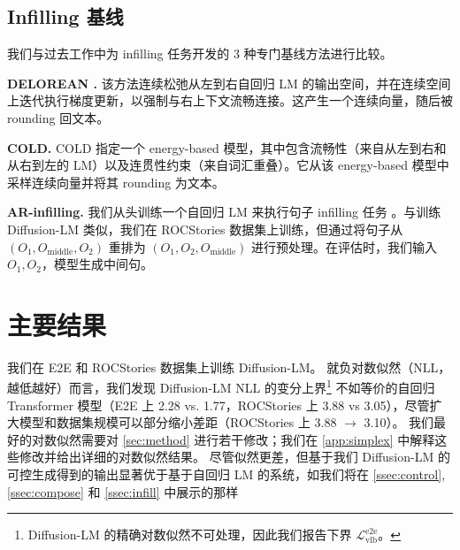 \documentclass{article}
\begin{document}
\subsection{Infilling 基线}

我们与过去工作中为 infilling 任务开发的 3 种专门基线方法进行比较。

\textbf{DELOREAN \cite{qin-etal-2020-back}.} 该方法连续松弛从左到右自回归 LM 的输出空间，并在连续空间上迭代执行梯度更新，以强制与右上下文流畅连接。这产生一个连续向量，随后被 rounding 回文本。

\textbf{COLD\cite{Qin-COLD}.} COLD 指定一个 energy-based 模型，其中包含流畅性（来自从左到右和从右到左的 LM）以及连贯性约束（来自词汇重叠）。它从该 energy-based 模型中采样连续向量并将其 rounding 为文本。


\textbf{AR-infilling.} 我们从头训练一个自回归 LM 来执行句子 infilling 任务 \cite{donahue-etal-2020-enabling}。与训练 Diffusion-LM 类似，我们在 ROCStories 数据集上训练，但通过将句子从 $(O_1, O_\text{middle} , O_2)$ 重排为 $(O_1, O_2, O_\text{middle})$ 进行预处理。在评估时，我们输入 $O_1, O_2$，模型生成中间句。










\section{主要结果}
我们在 E2E 和 ROCStories 数据集上训练 Diffusion-LM。
就负对数似然（NLL，越低越好）而言，我们发现 Diffusion-LM NLL 的变分上界\footnote{Diffusion-LM 的精确对数似然不可处理，因此我们报告下界 $\mathcal{L}^\text{e2e}_{\text{vlb}}$。} 不如等价的自回归 Transformer 模型（E2E 上 2.28 vs. 1.77，ROCStories 上 3.88 vs 3.05），尽管扩大模型和数据集规模可以部分缩小差距（ROCStories 上 3.88 $\xrightarrow{}$ 3.10）。
我们最好的对数似然需要对 \cref{sec:method} 进行若干修改；我们在 \cref{app:simplex} 中解释这些修改并给出详细的对数似然结果。
尽管似然更差，但基于我们 Diffusion-LM 的可控生成得到的输出显著优于基于自回归 LM 的系统，如我们将在 \cref{ssec:control},\cref{ssec:compose} 和 \cref{ssec:infill} 中展示的那样

\newcommand{\fluency}{lm $\downarrow$}
\newcommand{\success}{ctrl $\uparrow$}
\end{document}

